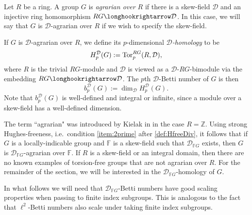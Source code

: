 \documentclass[11pt, letterpaper]{amsart}
\begin{document}
\begin{defn}
Let $R$ be a ring. A group $G$ is \textit{agrarian over $R$} if there is a skew-field $\mathcal{D}$ and an injective ring homomorphism $R G \longhookrightarrow \mathcal{D}$. In this case, we will say that $G$ is $\mathcal{D}$-agrarian over $R$ if we wish to specify the skew-field.

If $G$ is $\mathcal{D}$-agrarian over $R$, we define its $p$-dimensional \textit{$\mathcal{D}$-homology} to be
\[
    H_p^{\mathcal{D}} (G) := \operatorname{Tor}_p^{RG} (R, \mathcal{D}),
\]
where $R$ is the trivial $RG$-module and $\mathcal{D}$ is viewed as a $\mathcal{D}$-$RG$-bimodule via the embedding $RG \longhookrightarrow \mathcal{D}$. The $p$th $\mathcal{D}$-Betti number of $G$ is then
\[
    b_p^{\mathcal{D}}(G) := \dim_\mathcal{D} H_p^{\mathcal{D}} (G).
\]
Note that $b_p^{\mathcal{D}}(G)$ is well-defined and integral or infinite, since a module over a skew-field has a well-defined dimension.
\end{defn}

\begin{rem}
The term ``agrarian" was introduced by Kielak in \cite{KielakBNSviaNewton} in the case $R = \mathbb{Z}$. Using strong Hughes-freeness, i.e.~condition \ref{item:2prime} after \cref{def:HfreeDiv}, it follows that if $G$ is a locally-indicable group and $\mathbb{F}$ is a skew-field such that $\mathcal{D}_{\mathbb{F}G}$ exists, then $G$ is $\mathcal{D}_{\mathbb{F}G}$-agrarian over $\mathbb{F}$. If $R$ is a skew-field or an integral domain, then there are no known examples of torsion-free groups that are not agrarian over $R$. For the remainder of the section, we will be interested in the $\mathcal{D}_{\mathbb{F}G}$-homology of $G$.
\end{rem}


In what follows we will need that $\mathcal{D}_{\mathbb{F}G}$-Betti numbers have good scaling properties when passing to finite index subgroups. This is analogous to the fact that $\ell^2$-Betti numbers also scale under taking finite index subgroups.
\end{document}
